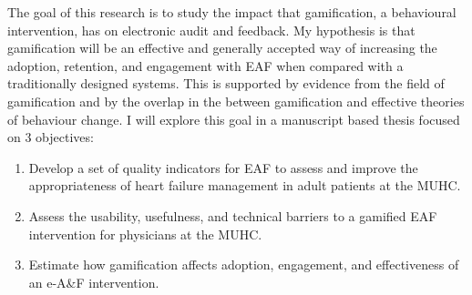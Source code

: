 The goal of this research is to study the impact that gamification, a behavioural intervention, has on electronic audit and feedback. My hypothesis is that gamification will be an effective and generally accepted way of increasing the adoption, retention, and engagement with \gls{EAF} when compared with a traditionally designed systems. This is supported by evidence from the field of gamification and by the overlap in the between gamification and effective theories of behaviour change. I will explore this goal in a manuscript based thesis focused on 3 objectives:

\begin{enumerate}
    \item Develop a set of quality indicators for \gls{EAF} to assess and improve the appropriateness of heart failure management in adult patients at the MUHC.
    \item Assess the usability, usefulness, and technical barriers to a gamified \gls{EAF} intervention for physicians at the MUHC.
    \item Estimate how gamification affects adoption, engagement, and effectiveness of an e-A\&F intervention.
\end{enumerate}